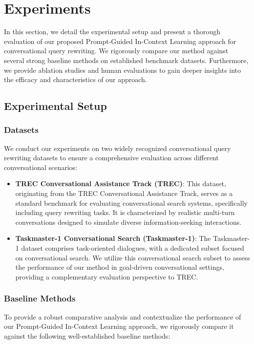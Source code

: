 \section{Experiments}

In this section, we detail the experimental setup and present a thorough evaluation of our proposed Prompt-Guided In-Context Learning approach for conversational query rewriting. We rigorously compare our method against several strong baseline methods on established benchmark datasets.  Furthermore, we provide ablation studies and human evaluations to gain deeper insights into the efficacy and characteristics of our approach.

\subsection{Experimental Setup}

\subsubsection{Datasets}
We conduct our experiments on two widely recognized conversational query rewriting datasets to ensure a comprehensive evaluation across different conversational scenarios:

\begin{itemize}
    \item \textbf{TREC Conversational Assistance Track (TREC)}: This dataset, originating from the TREC Conversational Assistance Track, serves as a standard benchmark for evaluating conversational search systems, specifically including query rewriting tasks. It is characterized by realistic multi-turn conversations designed to simulate diverse information-seeking interactions.
    \item \textbf{Taskmaster-1 Conversational Search (Taskmaster-1)}: The Taskmaster-1 dataset comprises task-oriented dialogues, with a dedicated subset focused on conversational search. We utilize this conversational search subset to assess the performance of our method in goal-driven conversational settings, providing a complementary evaluation perspective to TREC.
\end{itemize}

\subsubsection{Baseline Methods}
To provide a robust comparative analysis and contextualize the performance of our Prompt-Guided In-Context Learning approach, we rigorously compare it against the following well-established baseline methods:

